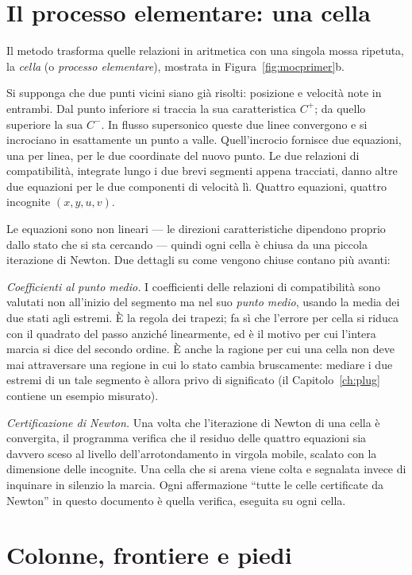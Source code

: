 \section{Il processo elementare: una cella}

Il metodo trasforma quelle relazioni in aritmetica con una singola
mossa ripetuta, la \emph{cella} (o \emph{processo elementare}),
mostrata in Figura~\ref{fig:mocprimer}b.

Si supponga che due punti vicini siano già risolti: posizione e
velocità note in entrambi. Dal punto inferiore si traccia la sua
caratteristica $C^{+}$; da quello superiore la sua $C^{-}$. In
flusso supersonico queste due linee convergono e si incrociano in
esattamente un punto a valle. Quell'incrocio fornisce due equazioni,
una per linea, per le due coordinate del nuovo punto. Le due
relazioni di compatibilità, integrate lungo i due brevi segmenti
appena tracciati, danno altre due equazioni per le due componenti di
velocità lì. Quattro equazioni, quattro incognite $(x, y, u, v)$.

Le equazioni sono non lineari --- le direzioni caratteristiche
dipendono proprio dallo stato che si sta cercando --- quindi ogni
cella è chiusa da una piccola iterazione di Newton. Due dettagli su
come vengono chiuse contano più avanti:

\emph{Coefficienti al punto medio.} I coefficienti delle relazioni
di compatibilità sono valutati non all'inizio del segmento ma nel
suo \emph{punto medio}, usando la media dei due stati agli estremi.
È la regola dei trapezi; fa sì che l'errore per cella si riduca con
il quadrato del passo anziché linearmente, ed è il motivo per cui
l'intera marcia si dice del secondo ordine. È anche la ragione per
cui una cella non deve mai attraversare una regione in cui lo stato
cambia bruscamente: mediare i due estremi di un tale segmento è
allora privo di significato (il Capitolo~\ref{ch:plug} contiene un
esempio misurato).

\emph{Certificazione di Newton.} Una volta che l'iterazione di
Newton di una cella è convergita, il programma verifica che il
residuo delle quattro equazioni sia davvero sceso al livello
dell'arrotondamento in virgola mobile, scalato con la dimensione
delle incognite. Una cella che si arena viene colta e segnalata
invece di inquinare in silenzio la marcia. Ogni affermazione
``tutte le celle certificate da Newton'' in questo documento è
quella verifica, eseguita su ogni cella.

\section{Colonne, frontiere e piedi}

